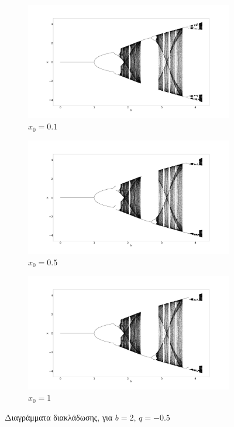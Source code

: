 \begin{figure}[ht]
	\centering
	\begin{subfigure}[b]{0.8\textwidth}
		\centering
		\includegraphics[width=\textwidth]{LateX images/sine q=-0.5/g4}
		\caption{\(x_0=0.1\)}
		\label{f:g46}
	\end{subfigure}
	\hfill
	\begin{subfigure}[b]{0.8\textwidth}
		\centering
		\includegraphics[width=\textwidth]{LateX images/sine q=-0.5/g5}
		\caption{\(x_0=0.5\)}
		\label{f:g47}
	\end{subfigure}
	\hfill
	\begin{subfigure}[b]{0.8\textwidth}
		\centering
		\includegraphics[width=\textwidth]{LateX images/sine q=-0.5/g6}
		\caption{\(x_0=1\)}
		\label{f:g48}
	\end{subfigure}
	\caption{ Διαγράμματα διακλάδωσης, για $b = 2$, $q=-0.5$}
	\label{f:48}
\end{figure}

